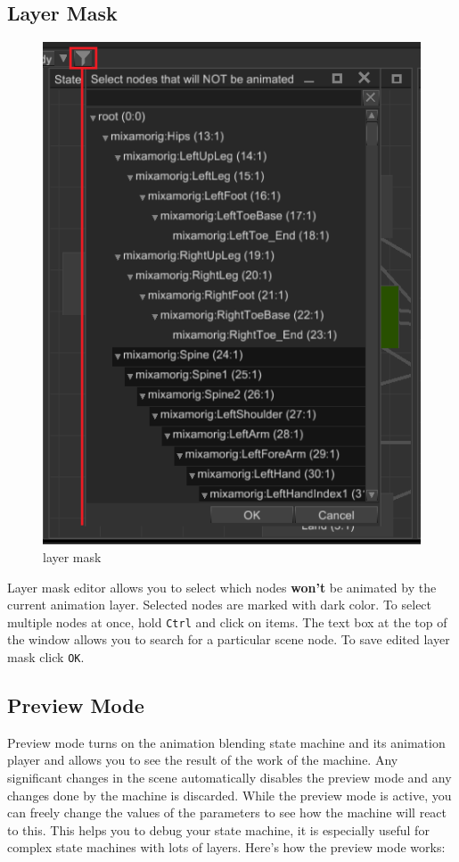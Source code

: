 \documentclass[
]{book}
\theoremstyle{definition}
\theoremstyle{definition}
\theoremstyle{definition}
\theoremstyle{definition}
\theoremstyle{remark}
\begin{document}
\subsection{Layer Mask}\label{layer-mask}

\begin{figure}
\centering
\includegraphics{images/animation/absm_layer_mask.png}
\caption{layer mask}
\end{figure}

Layer mask editor allows you to select which nodes \textbf{won't} be animated by the current animation layer. Selected nodes are marked with dark color. To select multiple nodes at once, hold \texttt{Ctrl} and click on items. The text box at the top of the window allows you to search for a particular scene node. To save edited layer mask click \texttt{OK}.

\subsection{Preview Mode}\label{preview-mode-1}

Preview mode turns on the animation blending state machine and its animation player and allows you to see the result of the work of the machine. Any significant changes in the scene automatically disables the preview mode and any changes done by the machine is discarded. While the preview mode is active, you can freely change the values of the parameters to see how the machine will react to this. This helps you to debug your state machine, it is especially useful for complex state machines with lots of layers. Here's how the preview mode works:
\end{document}
